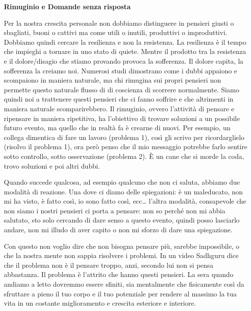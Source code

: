 \documentclass[12pt]{book} %
\begin{document}
\textbf{Rimuginio e Domande senza risposta}

Per la nostra crescita personale non dobbiamo distinguere in pensieri giusti o sbagliati, buoni o cattivi ma come utili
o inutili, produttivi o improduttivi. Dobbiamo quindi cercare la resilienza e non la resistenza. La resilienza è il
tempo che impieghi a tornare in uno stato di quiete. Mentre il prodotto tra la resistenza e il dolore/disagio che
stiamo provando provoca la sofferenza. Il dolore capita, la sofferenza la creiamo noi. Numerosi studi dimostrano come i
dubbi appaiono e scompaiono in maniera naturale, ma chi rimugina sui propri pensieri non permette questo naturale
flusso di di coscienza di scorrere normalmente. Siamo quindi noi a trattenere questi pensieri che ci fanno soffrire e
che altrimenti in maniera naturale scomparirebbero. Il rimuginio, ovvero l'attività di pensare e
ripensare in maniera ripetitiva, ha l'obiettivo di trovare soluzioni a un possibile futuro evento, ma quello che in
realtà fa è crearne di nuovi. Per esempio, un collega dimentica di fare un lavoro (problema 1), così gli scrivo per
ricordarglielo (risolvo il problema 1), ora però penso che il mio messaggio potrebbe farlo sentire sotto controllo,
sotto osservazione (problema 2). È un cane che si morde la coda, trovo soluzioni e poi altri dubbi.

Quando succede qualcosa, ad esempio qualcuno che non ci saluta, abbiamo due modalità di reazione. Una dove ci diamo delle spiegazioni: è un maleducato, non mi ha visto, è fatto così, io sono fatto così, ecc… l'altra modalità, consapevole che non siamo i nostri pensieri ci porta a pensare: non so perché non mi abbia salutato, sto solo cercando di dare senso a questo evento, quindi posso lasciarlo andare, non mi illudo di aver capito o non mi sforzo di dare una spiegazione.

Con questo non voglio dire che non bisogna pensare più, sarebbe impossibile, o che la nostra mente non sappia risolvere
i problemi. In un video Sadhguru dice che il problema non è il pensare troppo, anzi, secondo lui non si pensa abbastanza. Il problema è l'attrito che hanno questi pensieri. La sera quando andiamo a letto dovremmo essere sfiniti, sia mentalmente che fisicamente così da sfruttare a pieno il tuo corpo e il tuo potenziale per rendere al massimo la tua vita in un costante miglioramento e crescita esteriore e interiore.
\end{document}
